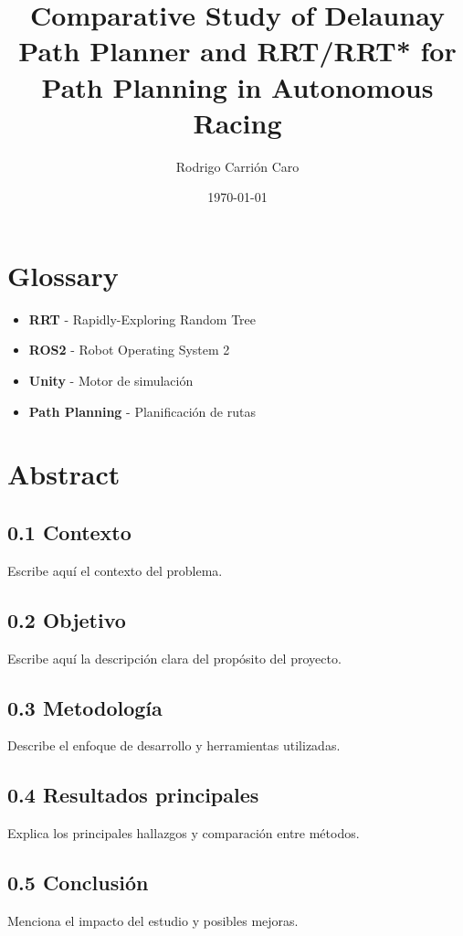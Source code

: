\documentclass[a4paper,11pt]{report}
\title{\textbf{Comparative Study of Delaunay Path Planner and RRT/RRT* for Path Planning in Autonomous Racing}}
\author{Rodrigo Carri\'on Caro}
\date{\today}
\begin{document}
\maketitle
\tableofcontents
\newpage

\chapter*{Glossary}
\begin{itemize}
    \item \textbf{RRT} - Rapidly-Exploring Random Tree
    \item \textbf{ROS2} - Robot Operating System 2
    \item \textbf{Unity} - Motor de simulación
    \item \textbf{Path Planning} - Planificación de rutas
\end{itemize}
\newpage

\chapter*{Abstract}
\section*{0.1 Contexto}
Escribe aquí el contexto del problema.

\section*{0.2 Objetivo}
Escribe aquí la descripción clara del propósito del proyecto.

\section*{0.3 Metodología}
Describe el enfoque de desarrollo y herramientas utilizadas.

\section*{0.4 Resultados principales}
Explica los principales hallazgos y comparación entre métodos.

\section*{0.5 Conclusión}
Menciona el impacto del estudio y posibles mejoras.
\newpage
\end{document}
